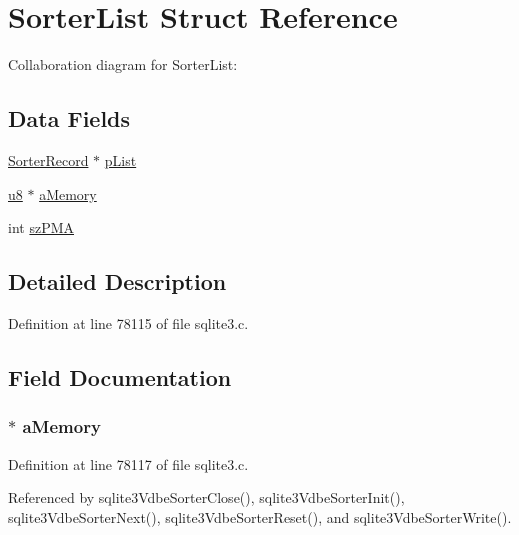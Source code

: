 \hypertarget{struct_sorter_list}{}\section{Sorter\+List Struct Reference}
\label{struct_sorter_list}


Collaboration diagram for Sorter\+List\+:
\subsection*{Data Fields}
\begin{DoxyCompactItemize}
\item 
\hyperlink{struct_sorter_record}{Sorter\+Record} $\ast$ \hyperlink{struct_sorter_list_a381073bea893f4394ec3ae3a8a6a88d9}{p\+List}
\item 
\hyperlink{sqlite3_8c_a74a0f6424ae628af25f23f0a35f6ead3}{u8} $\ast$ \hyperlink{struct_sorter_list_a2ab2d4febd163cec55b25155985af74f}{a\+Memory}
\item 
int \hyperlink{struct_sorter_list_a842a50350f36586dc944049b73ffdccd}{sz\+P\+M\+A}
\end{DoxyCompactItemize}


\subsection{Detailed Description}


Definition at line 78115 of file sqlite3.\+c.



\subsection{Field Documentation}
\hypertarget{struct_sorter_list_a2ab2d4febd163cec55b25155985af74f}{}
\subsubsection[{a\+Memory}]{$\ast$ a\+Memory}\label{struct_sorter_list_a2ab2d4febd163cec55b25155985af74f}


Definition at line 78117 of file sqlite3.\+c.



Referenced by sqlite3\+Vdbe\+Sorter\+Close(), sqlite3\+Vdbe\+Sorter\+Init(), sqlite3\+Vdbe\+Sorter\+Next(), sqlite3\+Vdbe\+Sorter\+Reset(), and sqlite3\+Vdbe\+Sorter\+Write().

